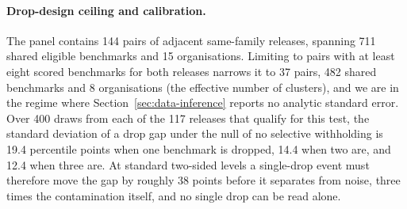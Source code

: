 \paragraph{Drop-design ceiling and calibration.}
The panel contains 144 pairs of adjacent same-family releases, spanning 711 shared eligible benchmarks and 15 organisations. Limiting to pairs with at least eight scored benchmarks for both releases narrows it to 37 pairs, 482 shared benchmarks and 8 organisations (the effective number of clusters), and we are in the regime where Section~\ref{sec:data-inference} reports no analytic standard error. Over 400 draws from each of the 117 releases that qualify for this test, the standard deviation of a drop gap under the null of no selective withholding is 19.4 percentile points when one benchmark is dropped, 14.4 when two are, and 12.4 when three are. At standard two-sided levels a single-drop event must therefore move the gap by roughly 38 points before it separates from noise, three times the contamination itself, and no single drop can be read alone.

